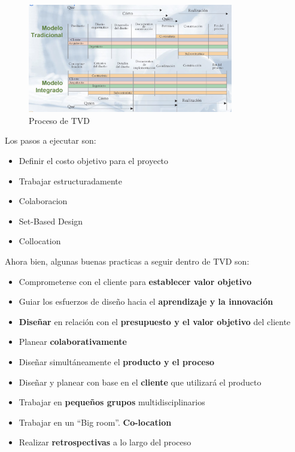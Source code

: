 \begin{figure}[H]
\centering
\includegraphics[width=0.8\textwidth]{IMAGENES/TVD.png}
\caption{Proceso de TVD}
\label{fig:tvd}
\end{figure}

Los pasos a ejecutar son:

\begin{itemize}
    \item Definir el costo objetivo para el proyecto
    \item Trabajar estructuradamente
    \item Colaboracion
    \item Set-Based Design
    \item Collocation
\end{itemize}

Ahora bien, algunas buenas practicas a seguir dentro de TVD son:

\begin{itemize}
    \item Comprometerse con el cliente para \textbf{establecer valor objetivo}
    \item Guiar los esfuerzos de diseño hacia el \textbf{aprendizaje y la innovación}
    \item \textbf{Diseñar} en relación con el \textbf{presupuesto y el valor objetivo} del cliente
    \item Planear \textbf{colaborativamente}
    \item Diseñar simultáneamente el \textbf{producto y el proceso}
    \item Diseñar y planear con base en el \textbf{cliente} que utilizará el producto
    \item Trabajar en \textbf{pequeños grupos} multidisciplinarios
    \item Trabajar en un “Big room”. \textbf{Co-location}
    \item Realizar \textbf{retrospectivas} a lo largo del proceso
\end{itemize}

